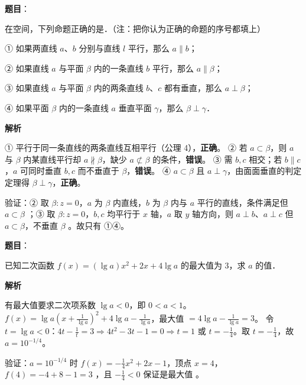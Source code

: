 \begin{answer}

\textbf{题目}：

在空间，下列命题正确的是\gkblank{}．（注：把你认为正确的命题的序号都填上）

① 如果两直线 $a$、$b$ 分别与直线 $l$ 平行，那么 $a \parallel b$；

② 如果直线 $a$ 与平面 $\beta$ 内的一条直线 $b$ 平行，那么 $a \parallel \beta$；

③ 如果直线 $a$ 与平面 $\beta$ 内的两条直线 $b$、$c$ 都有垂直，那么 $a \perp \beta$；

④ 如果平面 $\beta$ 内的一条直线 $a$ 垂直平面 $\gamma$，那么 $\beta \perp \gamma$．

\textbf{解析}

① 平行于同一条直线的两条直线互相平行（公理 4），\textbf{正确}。
② 若 $a\subset\beta$，则 $a$ 与 $\beta$ 内某直线平行却 $a\not\parallel\beta$，缺少 $a\not\subset\beta$ 的条件，\textbf{错误}。
③ 需 $b,c$ 相交；若 $b\parallel c$，$a$ 可同时垂直 $b,c$ 而不垂直于 $\beta$，\textbf{错误}。
④ $a\subset\beta$ 且 $a\perp\gamma$，由面面垂直的判定定理得 $\beta\perp\gamma$，\textbf{正确}。

验证：② 取 $\beta:z=0$，$a$ 为 $\beta$ 内直线，$b$ 为 $\beta$ 内与 $a$ 平行的直线，条件满足但 $a\subset\beta$ ；③ 取 $\beta:z=0$，$b,c$ 均平行于 $x$ 轴，$a$ 取 $y$ 轴方向，则 $a\perp b$、$a\perp c$ 但 $a\subset\beta$，不垂直 $\beta$ 。故只有 ①④。


\end{answer}
\begin{answer}

\textbf{题目}：

已知二次函数 $f(x) = (\lg a)x^2 + 2x + 4\lg a$ 的最大值为 3，求 $a$ 的值．

\textbf{解析}

有最大值要求二次项系数 $\lg a<0$，即 $0<a<1$。
$f(x)=\lg a\left(x+\frac{1}{\lg a}\right)^2+4\lg a-\frac{1}{\lg a}$，最大值 $=4\lg a-\frac{1}{\lg a}=3$。
令 $t=\lg a<0$：$4t-\frac1t=3\Rightarrow4t^2-3t-1=0\Rightarrow t=1$ 或 $t=-\frac14$。取 $t=-\frac14$，故 $a=10^{-1/4}$。

验证：$a=10^{-1/4}$ 时 $f(x)=-\frac14x^2+2x-1$，顶点 $x=4$，$f(4)=-4+8-1=3$ ，且 $-\frac14<0$ 保证是最大值 。


\end{answer}

